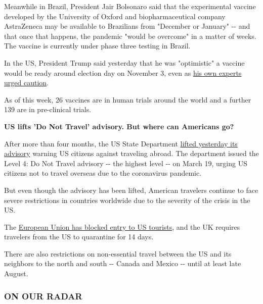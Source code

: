 Meanwhile in Brazil, President Jair Bolsonaro said that the experimental
vaccine developed by the University of Oxford and biopharmaceutical
company AstraZeneca may be available to Brazilians from "December or
January" -\/- and that once that happens, the pandemic "would be
overcome" in a matter of weeks. The vaccine is currently under phase
three testing in Brazil.

In the US, President Trump said yesterday that he was "optimistic" a
vaccine would be ready around election day on November 3, even as
\href{https://cnn.com/2020/08/07/politics/donald-trump-vaccines-election-2020/index.html}{his
own experts urged caution}.

As of this week, 26 vaccines are in human trials around the world and a
further 139 are in pre-clinical trials.

\textbf{US lifts 'Do Not Travel' advisory. But where can Americans go?}

After more than four months, the US State Department
\href{https://cnn.com/2020/08/06/politics/state-department-level-4-advisory-lifted/index.html}{lifted
yesterday its advisory} warning US citizens against traveling abroad.
The department issued the Level 4: Do Not Travel advisory -\/- the
highest level -\/- on March 19, urging US citizens not to travel
overseas due to the coronavirus pandemic.

But even though the advisory has been lifted, American travelers
continue to face severe restrictions in countries worldwide due to the
severity of the crisis in the US.

The
\href{https://cnn.com/travel/article/us-international-travel-covid-19/index.html}{European
Union has blocked entry to US tourists}, and the UK requires travelers
from the US to quarantine for 14 days.

There are also restrictions on non-essential travel between the US and
its neighbors to the north and south -\/- Canada and Mexico -\/- until
at least late August.

\hypertarget{on-our-radar}{%
\subsubsection{\texorpdfstring{\textbf{ON OUR
RADAR}}{ON OUR RADAR}}\label{on-our-radar}}

